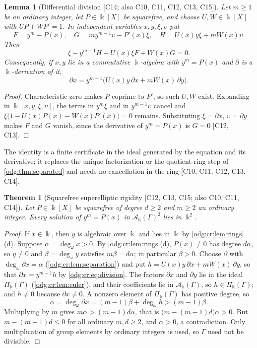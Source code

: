 \documentclass[11pt,oneside]{article}
\numberwithin{equation}{section}
\newtheorem{theorem}{Theorem}[section]
\newtheorem{lemma}[lemma]{Lemma}
\theoremstyle{definition}
\theoremstyle{remark}
\newcommand{\ddeg}{\operatorname{deg}_{\omega}}
\newcommand{\src}[1]{\textup{\textsf{\small[#1]}}}
\newcommand{\crA}{\mathcal A_\Bbbk(\Gamma)}
\newcommand{\crP}{\Pi_\Bbbk(\Gamma)}
\begin{document}
\begin{lemma}[Differential division \src{C14; also C10, C11, C12, C13, C15}]\label{odg:cr:lem:division}
Let $m\ge1$ be an ordinary integer, let $P\in\Bbbk[X]$ be squarefree,
and choose $U,W\in\Bbbk[X]$ with
$UP+WP'=1$. In independent variables $x,y,\xi,\upsilon$ put
\[
 F=y^m-P(x),\quad G=my^{m-1}\upsilon-P'(x)\xi,\quad
 H=U(x)y\xi+mW(x)\upsilon .
\]
Then
\begin{equation}\label{odg:cr:eq:universal}
 \xi-y^{m-1}H+U(x)\xi F+W(x)G=0 .
\end{equation}
Consequently, if $x,y$ lie in a commutative $\Bbbk$-algebra with $y^m=P(x)$ and
$\partial$ is a $\Bbbk$-derivation of it,
\begin{equation}\label{odg:cr:eq:division}
 \partial x=y^{m-1}\bigl(U(x)y\,\partial x+mW(x)\,\partial y\bigr).
\end{equation}
\end{lemma}
\begin{proof}
Characteristic zero makes $P$ coprime to $P'$, so such $U,W$ exist.
Expanding in $\Bbbk[x,y,\xi,\upsilon]$, the terms in $y^m\xi$ and in
$y^{m-1}\upsilon$ cancel and
$\xi\bigl(1-U(x)P(x)-W(x)P'(x)\bigr)=0$ remains. Substituting
$\xi=\partial x$, $\upsilon=\partial y$ makes $F$ and $G$ vanish, since the
derivative of $y^m=P(x)$ is $G=0$ \src{C12, C13}.
\end{proof}

The identity is a finite certificate in the ideal generated by the equation and
its derivative; it replaces the unique factorization or the quotient-ring step of
\cref{odg:thm:separated} and needs no cancellation in the ring
\src{C10, C11, C12, C13, C14}.

\begin{theorem}[Squarefree superelliptic rigidity \src{C12, C13, C15; also C10, C11, C14}]\label{odg:cr:thm:squarefree}
Let $P\in\Bbbk[X]$ be squarefree of degree $d\ge2$ and $m\ge2$ an ordinary integer.
Every solution of $y^m=P(x)$ in $\crA^2$ lies in $\Bbbk^2$.
\end{theorem}
\begin{proof}
If $x\in\Bbbk$, then $y$ is algebraic over $\Bbbk$ and lies in $\Bbbk$ by
\cref{odg:cr:lem:rings}(d). Suppose $\alpha=\ddeg x>0$. By
\cref{odg:cr:lem:rings}(d), $P(x)\ne0$ has degree $d\alpha$, so $y\ne0$ and
$\beta=\ddeg y$ satisfies $m\beta=d\alpha$; in particular $\beta>0$. Choose
$\partial$ with $\ddeg\partial x=\alpha$ (\cref{odg:cr:lem:separation}) and put
$h=U(x)y\,\partial x+mW(x)\,\partial y$, so that $\partial x=y^{m-1}h$ by
\eqref{odg:cr:eq:division}. The factors $\partial x$ and $\partial y$ lie in the
ideal $\crP$ (\cref{odg:cr:lem:euler}), and their coefficients lie in $\crA$, so
$h\in\crP$; and $h\ne0$ because $\partial x\ne0$. A nonzero element of $\crP$ has
positive degree, so
\[
 \alpha=\ddeg\partial x=(m-1)\beta+\ddeg h>(m-1)\beta .
\]
Multiplying by $m$ gives $m\alpha>(m-1)d\alpha$, that is
$\bigl(m-(m-1)d\bigr)\alpha>0$. But $m-(m-1)d\le0$ for all ordinary $m,d\ge2$, and
$\alpha>0$, a contradiction. Only multiplication of group elements by ordinary
integers is used, so $\Gamma$ need not be divisible.
\end{proof}
\end{document}
